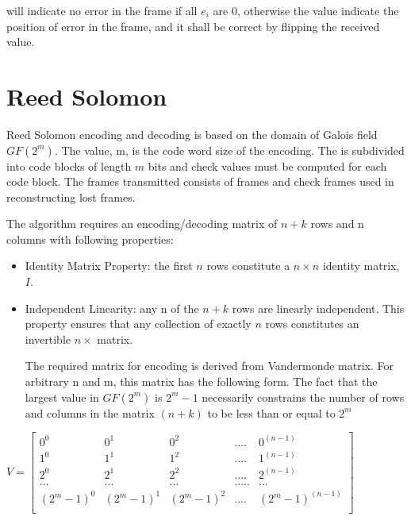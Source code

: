 will indicate no error in the frame if all $e_i$ are 0, otherwise the value indicate the position of error in the frame, and it shall be correct by flipping the received value.


\section{Reed Solomon}

Reed Solomon encoding and decoding is based on the domain of Galois  field $GF(2^m)$.  The value, m, is the code word size of the encoding. 
The \ControlMessage is subdivided into code blocks of length $m$ bits and check values must be computed for each code block. 
The frames transmitted consists of \ControlMessage frames and check frames used in reconstructing lost frames. 

The algorithm requires an encoding/decoding matrix of $n+k$ rows and n columns
with following properties:


\begin{itemize}
    \item Identity Matrix Property: the first $n$ rows constitute a $n \times n$ identity matrix, $I$. 
    \item Independent Linearity: any n of the $n+k$ rows are linearly independent. This property ensures that any collection of exactly $n$ rows constitutes an invertible $n \times $ matrix.

The required matrix for encoding is derived from Vandermonde matrix. For arbitrary n and m, this matrix has the following form. The fact
that the largest value in $GF(2^m)$ is $2^m-1$ necessarily constrains the number of rows and columns in the matrix $(n + k)$ to be less than or equal to $2^m$
\end{itemize}

\vspace{0.5cm}
\begin{center}
$V= 
\begin{bmatrix} 

0^0 & 0^1 & 0^2 & .... & 0^{(n-1)} \\ 
1^0 & 1^1 & 1^2 & .... & 1^{(n-1)} \\
2^0 & 2^1 & 2^2 & .... & 2^{(n-1)} \\ 
... & ... & ... & .....& ...	   \\
(2^m-1)^0 & (2^m-1)^1 & (2^m-1)^2 & .... & (2^m-1)^{(n-1)} \\

\end{bmatrix}$
\end{center}
\vspace{0.5cm}

